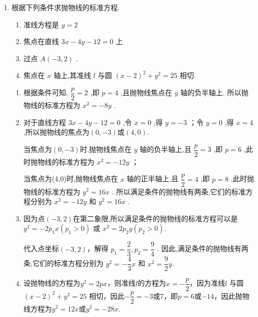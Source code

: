 \begin{enumerate}
\begin{jieda}
        $|AF|$等于$A$到准线$x = -1$的距离，因此$A$的横坐标为1，故$A(1, \pm 2)$，不妨取 $A\left( {1,2}\right)$，则 $\left| {AB}\right|  = \sqrt{{\left( 1 - 3\right) }^{2} + {\left( 2 - 0\right) }^{2}} = \sqrt{8} = 2\sqrt{2}$ .
    \end{jieda} 

    \item 根据下列条件求抛物线的标准方程.
    \begin{enumerate}
        \item 准线方程是 $y = 2$ 
        \item 焦点在直线 ${3x} - {4y} - {12} = 0$ 上
        \item 过点 $A\left( {-3,2}\right)$ .
        \item 焦点在 $x$ 轴上,其准线 $l$ 与圆 ${\left( x - 2\right) }^{2} + {y}^{2} = {25}$ 相切.
    \end{enumerate}
    \begin{jieda}
        \begin{enumerate}
            \item 根据条件可知, $\dfrac{p}{2} = 2$ ,即 $p = 4$ ,且抛物线焦点在 $y$ 轴的负半轴上. 所以抛物线的标准方程为 ${x}^{2} =  - {8y}$ .
            \item 对于直线方程 ${3x} - {4y} - {12} = 0$ ,令 $x = 0$ ,得 $y =  - 3$ ；令 $y = 0$ ,得 $x = 4$ ,所以抛物线的焦点为$(0, -3)$或$(4,0)$.
            
            当焦点为$(0, -3)$时,抛物线焦点在 $y$ 轴的负半轴上,且 $\dfrac{p}{2} = 3$ ,即 $p = 6$ ,此时抛物线的标准方程为 ${x}^{2} =  - {12y}$ ；
            
            当焦点为(4,0)时,抛物线焦点在 $x$ 轴的正半轴上,且 $\dfrac{p}{2} = 4$ ,即 $p = 8$ ,此时抛物线的标准方程为 ${y}^{2} = {16x}$ . 所以满足条件的抛物线有两条,它们的标准方程分别为 ${x}^{2} =  - {12y}$ 和 ${y}^{2} = {16x}$ .
            \item 因为点$(-3,2)$在第二象限,所以满足条件的抛物线的标准方程可以是${y}^{2} =  - 2{p}_{1}x\left( {{p}_{1} > 0}\right) \text{ 或 }{x}^{2} = 2{p}_{2}y\left( {{p}_{2} > 0}\right) .$
            
            代入点坐标$(-3,2)$，解得 ${p}_{1} = \dfrac{2}{3},{p}_{2} = \dfrac{9}{4}$ . 因此,满足条件的抛物线有两条,它们的标准方程分别为 ${y}^{2} =  - \dfrac{4}{3}x$ 和 ${x}^{2} = \dfrac{9}{2}y$.

            \item 设抛物线的方程为$y^2 = 2px$，则准线$l$的方程为$x = -\dfrac{p}{2}$，因为准线$l$ 与圆 ${\left( x - 2\right) }^{2} + {y}^{2} = {25}$ 相切，因此$-\dfrac{p}{2} = -3$或$7$，即$p = 6$或$-14$，因此抛物线方程为$y^2 = 12x$或$y^2 = -28x$.
        \end{enumerate}
    \end{jieda}


\end{enumerate}
